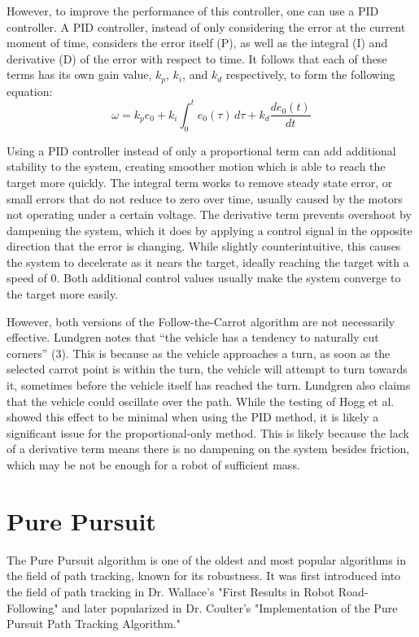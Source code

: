 \documentclass[mla7]{mla}
\begin{document}
\begin{paper}
However, to improve the performance of this controller, one can use a PID controller. A PID controller, instead of only considering the error at the current moment of time, considers the error itself (P), as well as the integral (I) and derivative (D) of the error with respect to time. It follows that each of these terms has its own gain value, $k_p$, $k_i$, and $k_d$ respectively, to form the following equation:
\begin{equation}
\omega = k_p e_0 + k_i \int_0^t \! e_0(\tau) \, d\tau + k_d \frac{de_0(t)}{dt}
\end{equation}

Using a PID controller instead of only a proportional term can add additional stability to the system, creating smoother motion which is able to reach the target more quickly. The integral term works to remove steady state error, or small errors that do not reduce to zero over time, usually caused by the motors not operating under a certain voltage. The derivative term prevents overshoot by dampening the system, which it does by applying a control signal in the opposite direction that the error is changing. While slightly counterintuitive, this causes the system to decelerate as it nears the target, ideally reaching the target with a speed of 0. Both additional control values usually make the system converge to the target more easily.

However, both versions of the Follow-the-Carrot algorithm are not necessarily effective. Lundgren notes that ``the vehicle has a tendency to naturally cut corners'' (3). This is because as the vehicle approaches a turn, as soon as the selected carrot point is within the turn, the vehicle will attempt to turn towards it, sometimes before the vehicle itself has reached the turn. Lundgren also claims that the vehicle could oscillate over the path. While the testing of Hogg et al. showed this effect to be minimal when using the PID method, it is likely a significant issue for the proportional-only method. This is likely because the lack of a derivative term means there is no dampening on the system besides friction, which may be not be enough for a robot of sufficient mass.

\section{Pure Pursuit}

The Pure Pursuit algorithm is one of the oldest and most popular algorithms in the field of path tracking, known for its robustness. It was first introduced into the field of path tracking in Dr. Wallace's "First Results in Robot Road-Following" and later popularized in Dr. Coulter's "Implementation of the Pure Pursuit Path Tracking Algorithm."


\end{paper}
\end{document}
